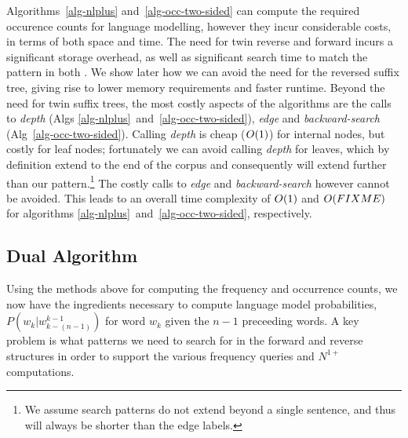 Algorithms~\ref{alg-nlplus} and~\ref{alg-occ-two-sided} can compute the required occurence counts for \ngram language modelling, however they incur considerable costs, in terms of both space and time. 
The need for twin reverse and forward \CSTs incurs a significant storage overhead, as well as significant search time to match the pattern in both \CSTs. 
We show later how we can avoid the need for the reversed suffix  tree, giving rise to lower memory requirements and faster runtime. 
Beyond the need for twin suffix trees, the most costly aspects of the algorithms are the calls to \emph{depth} (Algs \ref{alg-nlplus}~and~\ref{alg-occ-two-sided}), \emph{edge} and \emph{backward-search} (Alg~\ref{alg-occ-two-sided}).
Calling \emph{depth} is cheap ($O(1)$) for internal nodes, but costly for leaf nodes; fortunately we can avoid calling \emph{depth} for leaves, which by definition extend to the end of the corpus and consequently will extend further than our pattern.\footnote{We assume search patterns do not extend beyond a single sentence, and thus will always be shorter than the edge labels.}
The costly calls to \emph{edge} and \emph{backward-search} however cannot be avoided.
This leads to an overall time complexity of $O(1)$ and $O(FIXME)$ for algorithms \ref{alg-nlplus}~and~\ref{alg-occ-two-sided}, respectively.

\subsection{Dual \CST Algorithm} 

Using the methods above for computing the frequency and occurrence
counts, we now have the ingredients necessary to compute \ngram language model
probabilities, $P(w_k | w^{k-1}_{k-(n-1)})$ for word $w_k$ given the $n-1$
preceeding words. A key problem is what patterns we need to search for
in the forward and reverse \CST structures in order to support the
various frequency queries and $N^{1+}$ computations. 

